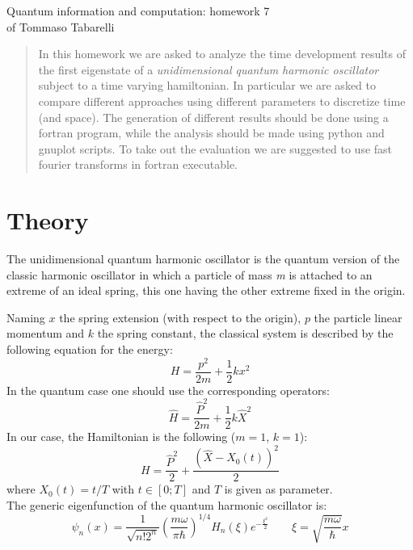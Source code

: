 \documentclass[12pt, a4paper, notitlepage]{report}
\begin{document}
\begin{center}
	\LARGE{Quantum information and computation: homework 7}\\
	\Large{of Tommaso Tabarelli}
\end{center}


\begin{abstract}
	In this homework we are asked to analyze the time development results of the first eigenstate of a \textit{unidimensional quantum harmonic oscillator} subject to a time varying hamiltonian. In particular we are asked to compare different approaches using different parameters to discretize time (and space). The generation of different results should be done using a fortran program, while the analysis should be made using python and gnuplot scripts.
	To take out the evaluation we are suggested to use fast fourier transforms in fortran executable.
\end{abstract}

\section*{Theory}

The unidimensional quantum harmonic oscillator is the quantum version of the classic harmonic oscillator in which a particle of mass \textit{m} is attached to an extreme of an ideal spring, this one having the other extreme fixed in the origin.

Naming $x$ the spring extension (with respect to the origin), $p$ the particle linear momentum and $k$ the spring constant, the classical system is described by the following equation for the energy:
\begin{equation}
	H = \frac{p^2}{2m} + \frac{1}{2} k x^2
\end{equation}
In the quantum case one should use the corresponding operators:
\begin{equation}
	\hat{H} = \frac{\hat{P}^2}{2m} + \frac{1}{2} k \hat{X}^2
\end{equation}
In our case, the Hamiltonian is the following ($m=1$, $k=1$):
\begin{equation}
H = \frac{\hat{P}^2}{2} + \frac{\left( \hat{X} - X_0(t) \right)^2}{2} 
\end{equation}
where $X_0(t) = t/T$ with $t \in \left[ 0; T\right]$ and $T$ is given as parameter.\\

The generic eigenfunction of the quantum harmonic oscillator is:
\begin{equation}
\psi_n (x) = \frac{1}{\sqrt{n! 2^n}} \left( \frac{m \omega}{\pi \hbar} \right)^{1/4} H_n(\xi) e^{-\frac{\xi^2}{2}} \qquad \xi = \sqrt{\frac{m \omega}{\hbar}} x
\end{equation}
\end{document}
